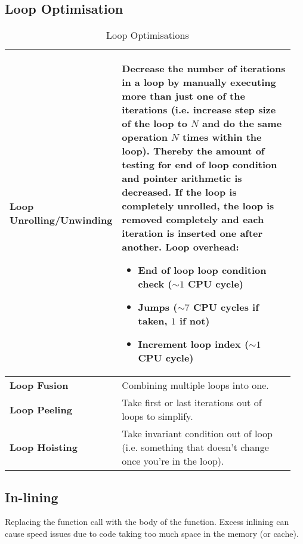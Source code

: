 	\subsection{Loop Optimisation }				
		\begin{table}[H]
			\centering
			\begin{tabular}{|p{0.3\linewidth}|p{0.65\linewidth}|}
					\hline
					\textbf{Loop Unrolling/Unwinding}
						& Decrease the number of iterations in a loop by manually executing more than just one of the iterations (i.e. increase step size of the loop to $N$ and do the same operation $N$ times within the loop). Thereby the amount of testing for end of loop condition and pointer arithmetic is decreased. If the loop is completely unrolled, the loop is removed completely and each iteration is inserted one after another.\newline
						\textbf{Loop overhead:}\newline
						\begin{itemize}
						  \item End of loop loop condition check ($\sim 1$ CPU cycle)
						  \item Jumps ($\sim 7$ CPU cycles if taken, $1$ if not)
						  \item Increment loop index ($\sim 1$ CPU cycle)
						\end{itemize}\\
					\hline
					\textbf{Loop Fusion}
						& Combining multiple loops into one.\\
					\hline
					\textbf{Loop Peeling}
						& Take first or last iterations out of loops to simplify.\\
					\hline
					\textbf{Loop Hoisting}
						& Take invariant condition out of loop (i.e. something that doesn't change once you're in the loop).\\
					\hline
			\end{tabular}
			\caption{Loop Optimisations}
		\end{table}
		
		
	\subsection{In-lining}
		Replacing the function call with the body of the function. Excess inlining can cause speed issues due to code taking too much space in the memory (or cache).